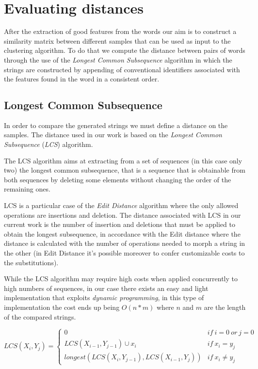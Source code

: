 \section{Evaluating distances}
After the extraction of good features from the words our aim is to construct a similarity matrix between different samples that can be used as input to the clustering algorithm. To do that we compute the distance between pairs of words through the use of the \emph{Longest Common Subsequence} algorithm in which the strings  are constructed by appending of conventional identifiers associated with the features found in the word in a consistent order. 


\subsection{Longest Common Subsequence} 

In order to compare the generated strings we must define a distance on the samples.
The distance used in our work is based on the \emph{Longest Common Subsequence} (\textit{LCS}) algorithm. 

The LCS algorithm aims at extracting from a set of sequences (in this case only two) the longest common subsequence, that is a sequence that is obtainable from both sequences by deleting some elements without changing the order of the remaining ones.

LCS is a particular case of the \emph{Edit Distance} algorithm where the only allowed operations are insertions and deletion.
The distance associated with LCS in our current work is the number of insertion and deletions that must be applied to obtain the longest subsequence, in accordance with the Edit distance where the distance is calculated with the number of operations needed to morph a string in the other (in Edit Distance it's possible moreover to confer customizable costs to the substitutions).   

While the LCS algorithm may require high costs when applied concurrently to high numbers of sequences, in our case there exists an easy and light implementation that exploits \textit{dynamic programming}, in this type of implementation the cost ends up being $O(n*m)$ where $n$ and $m$ are the length of the compared strings.  


$$\label{LCS}
LCS(X_i,Y_j) =
 \left\{\begin{array}{ll}
 \displaystyle
 0 & if~i=0~ or~ j=0\\
 LCS(X_{i-1},Y_{j-1})\cup x_i & if~ x_i=y_j\\
 longest(LCS(X_i,Y_{j-1}), LCS(X_{i-1},Y_j)) & if~ x_i\neq y_j
 \end{array}\right.
$$


